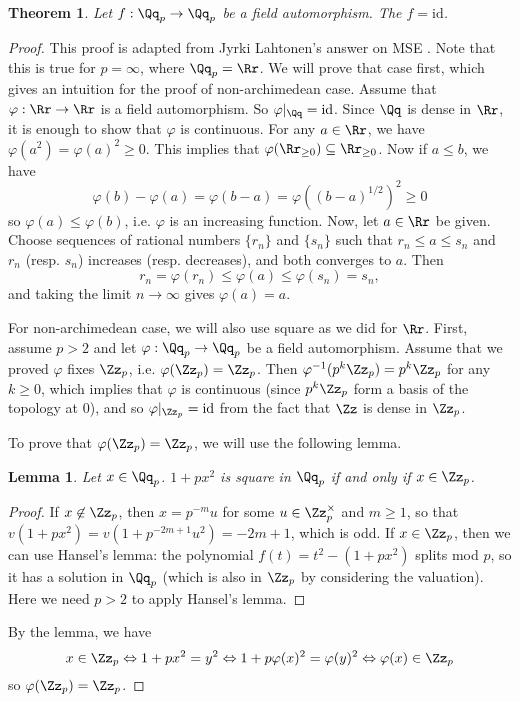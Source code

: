 \documentclass{article}
\newtheorem{theorem}{Theorem}
\newtheorem{lemma}{Lemma}
\begin{document}
\begin{theorem}
Let $f:\Qq_{p} \to \Qq_{p}$ be a field automorphism. The $f = \mathrm{id}$. 
\end{theorem}
\begin{proof}
This proof is adapted from Jyrki Lahtonen's answer on MSE \cite{jy}. 
Note that this is true for $p =\infty$, where $\Qq_{p} = \Rr$. We will prove that case first, which gives an intuition for the proof of non-archimedean case. 
Assume that $\varphi:\Rr\to \Rr$ is a field automorphism. So $\varphi|_{\Qq} = \mathrm{id}$. 
Since $\Qq$ is dense in $\Rr$, it is enough to show that $\varphi$ is continuous. 
For any $a\in\Rr$, we have $\varphi(a^{2}) =\varphi(a)^{2} \geq 0$. This implies that $\varphi(\Rr_{\geq 0}) \subseteq \Rr_{\geq 0}$. Now if $a\leq b$, we have
$$
\varphi(b) - \varphi(a) = \varphi(b-a) = \varphi((b-a)^{1/2})^{2} \geq 0
$$
so $\varphi(a) \leq \varphi(b)$, i.e. $\varphi$ is an increasing function. 
Now, let $a\in \Rr$ be given. Choose sequences of rational numbers $\{r_{n}\}$ and $\{s_{n}\}$ such that $r_{n} \leq a \leq s_{n}$ and $r_{n}$ (resp. $s_{n}$) increases (resp. decreases), and both converges to $a$. 
Then 
$$
r_{n} = \varphi(r_{n}) \leq \varphi(a) \leq \varphi(s_{n})  = s_{n},
$$
and taking the limit $n\to \infty$ gives $\varphi(a) = a$. 


For non-archimedean case, we will also use square as we did for $\Rr$. 
First, assume $p>2$ and let $\varphi:\Qq_p \to \Qq_p$ be a field automorphism. 
Assume that we proved $\varphi$ fixes $\Zz_p$, i.e. $\varphi(\Zz_p)  = \Zz_p$. 
Then $\varphi^{-1}(p^{k}\Zz_{p}) = p^{k}\Zz_{p}$ for any $k\geq 0$, which implies that $\varphi$ is continuous (since $p^{k}\Zz_{p}$ form a basis of the topology at $0$), and so $\varphi|_{\Zz_{p}} = \mathrm{id}$ from the fact that $\Zz$ is dense in $\Zz_{p}$. 

To prove that $\varphi(\Zz_{p}) =\Zz_{p}$, we will use the following lemma. 
\begin{lemma}
Let $x\in \Qq_{p}$. $1 + px^{2}$ is square in $\Qq_{p}$ if and only if $x\in \Zz_{p}$. 
\end{lemma}
\begin{proof}
If $x\not\in \Zz_p$, then $x = p^{-m}u$ for some $u\in \Zz_{p}^{\times}$ and $m\geq 1$, so that $v(1+px^{2}) = v(1+ p^{-2m+1}u^{2}) = -2m+1$, which is odd. 
If $x\in \Zz_{p}$, then we can use Hansel's lemma: the polynomial $f(t) = t^{2} - (1+px^{2})$ splits mod $p$, so it has a solution in $\Qq_{p}$ (which is also in $\Zz_{p}$ by considering the valuation). 
Here we need $p>2$ to apply Hansel's lemma. 
\end{proof}
By the lemma, we have
$$
x\in \Zz_{p}\Leftrightarrow 1+px^{2} = y^{2} \Leftrightarrow 1 + p\varphi(x)^{2} = \varphi(y)^{2} \Leftrightarrow \varphi(x)\in \Zz_{p}
$$
so $\varphi(\Zz_{p}) =\Zz_{p}$. 


\end{proof}
\end{document}
